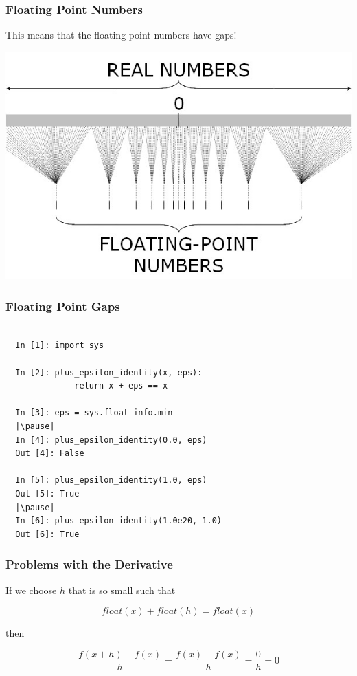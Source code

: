 \documentclass{beamer}
\begin{document}
\begin{frame}

\frametitle{Floating Point Numbers}

This means that the floating point numbers have gaps!

\begin{center}
\includegraphics[scale=.6]{float-gaps.jpg}
\end{center}

\end{frame}

\begin{frame}[fragile]
\frametitle{Floating Point Gaps}

\begin{lstlisting}

  In [1]: import sys

  In [2]: plus_epsilon_identity(x, eps):
              return x + eps == x

  In [3]: eps = sys.float_info.min
  |\pause|
  In [4]: plus_epsilon_identity(0.0, eps)
  Out [4]: False

  In [5]: plus_epsilon_identity(1.0, eps)
  Out [5]: True
  |\pause|
  In [6]: plus_epsilon_identity(1.0e20, 1.0)
  Out [6]: True

\end{lstlisting}

\end{frame}

\begin{frame}
\frametitle{Problems with the Derivative}

If we choose $h$ that is so small such that

\[ float(x) + float(h) = float(x) \]
\pause

then

\[ \frac{f(x+h) - f(x)}{h} = \frac{f(x) - f(x)}{h} = \frac{0}{h} = 0 \]

\end{frame}
\end{document}
